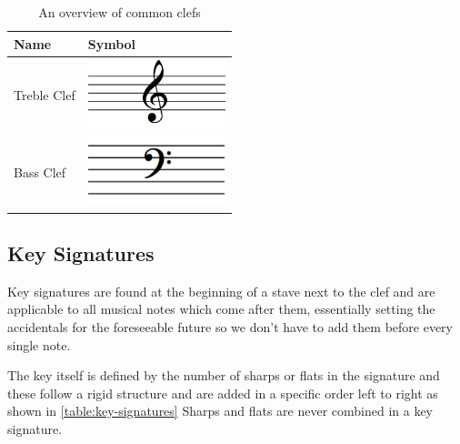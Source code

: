 \begin{table}[H]
    \renewcommand{\arraystretch}{1.8}
    \centering
    \begin{tabularx}{.4\textwidth}{ l l }
        \toprule
        Name & Symbol \\
        \midrule
        Treble Clef & \includegraphics[height=2cm]{gfx/music-theory/clef-treble.png} \\
        Bass Clef   & \includegraphics[height=2cm]{gfx/music-theory/clef-bass.png} \\
        \bottomrule
    \end{tabularx}
    \caption{An overview of common clefs}
    \label{table:clefs}
\end{table}

\subsection{Key Signatures}
\label{sec:music-theory-key-signatures}

Key signatures are found at the beginning of a stave next to the clef and are applicable to all musical notes which come after them, essentially setting the accidentals for the foreseeable future so we don't have to add them before every single note.

The key itself is defined by the number of sharps or flats in the signature and these follow a rigid structure and are added in a specific order left to right as shown in \cref{table:key-signatures} Sharps and flats are never combined in a key signature.


